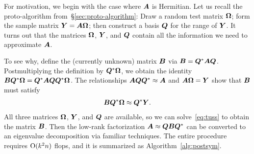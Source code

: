 \documentclass{article}
\begin{document}
For motivation, we begin with the case where $\bm{A}$ is Hermitian.
Let us recall the proto-algorithm from~\S\ref{sec:proto-algorithm}:
Draw a random test matrix $\bm{\Omega}$; form the sample matrix
$\bm{Y} = \bm{A\Omega}$; then construct a basis $\bm{Q}$ for the
range of $\bm{Y}$.  It turns out that the matrices $\bm{\Omega}$, $\bm{Y}$,
and $\bm{Q}$ contain all the information we need to approximate
$\bm{A}$.

To see why, define the (currently unknown) matrix $\bm{B}$
via $\bm{B} = \bm{Q}^* \bm{AQ}$.
Postmultiplying the definition by $\bm{Q}^* \bm{\Omega}$, we obtain the identity
$\bm{BQ}^* \bm{\Omega} = \bm{Q}^* \bm{AQQ}^* \bm{\Omega}$.
The relationships $\bm{AQQ}^* \approx \bm{A}$ and $\bm{A\Omega} = \bm{Y}$
show that $\bm{B}$ must satisfy
\begin{equation}
\label{eq:tuss}
\bm{BQ}^{*}\bm{\Omega} \approx \bm{Q}^{*}\bm{Y}.
\end{equation}
All three matrices $\bm{\Omega}$, $\bm{Y}$, and $\bm{Q}$
are available, so we can solve~\eqref{eq:tuss} to obtain the matrix $\bm{B}$.
Then the low-rank factorization $\bm{A} \approx \bm{QBQ}^*$ can
be converted to an eigenvalue decomposition via familiar techniques.
The entire procedure requires $\mathrm{O}(k^2 n)$ flops, and it is summarized
as Algorithm~\ref{alg:postsym}.

\lsp
\end{document}
